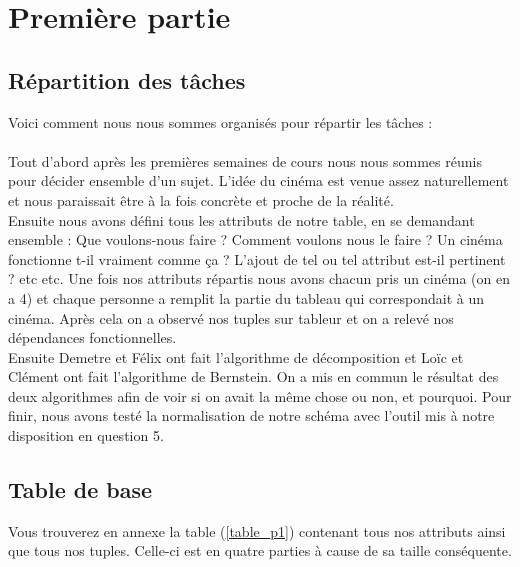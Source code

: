 \documentclass[a4paper,sffamily,12pt]{article}
\begin{document}
	\section{Première partie}

		\vspace{0.5cm}
								
		\subsection{Répartition des tâches}
	
			\vspace{0.5cm}
	
			\noindent Voici comment nous nous sommes organisés pour répartir les tâches : \\
			\\
			\indent Tout d'abord après les premières semaines de cours nous nous sommes réunis pour décider ensemble d'un sujet. L'idée du cinéma est venue assez naturellement et nous paraissait être à la fois concrète et proche de la réalité.\\
			\indent Ensuite nous avons défini tous les attributs de notre table, en se demandant ensemble : Que voulons-nous faire ? Comment voulons nous le faire ? Un cinéma fonctionne t-il vraiment comme ça ? L'ajout de tel ou tel attribut est-il pertinent ? etc etc. Une fois nos attributs répartis nous avons chacun pris un cinéma (on en a 4) et chaque personne a remplit la partie du tableau qui correspondait à un cinéma. Après cela on a observé nos tuples sur tableur et on a relevé nos dépendances fonctionnelles.\\
			\indent Ensuite Demetre et Félix ont fait l'algorithme de décomposition et Loïc et Clément ont fait l'algorithme de Bernstein. On a mis en commun le résultat des deux algorithmes afin de voir si on avait la même chose ou non, et pourquoi. Pour finir, nous avons testé la normalisation de notre schéma avec l'outil mis à notre disposition en question 5.
							
			\vspace{0.5cm}
			
		\subsection{Table de base}	
			
			\vspace{0.5cm}
				
			Vous trouverez en annexe la table (\ref{table_p1}) contenant tous nos attributs ainsi que tous nos tuples. Celle-ci est en quatre parties à cause de sa taille conséquente.
			
\end{document}
